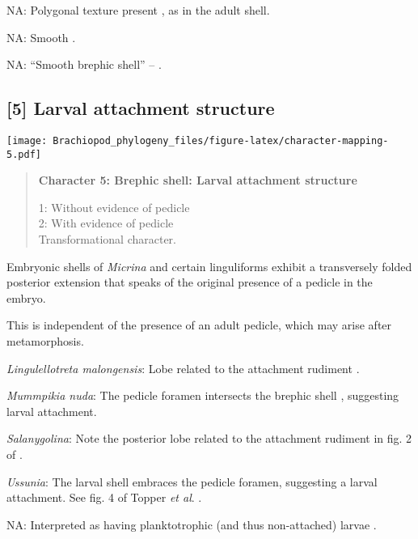 \documentclass[openany]{book}
\theoremstyle{definition}
\theoremstyle{definition}
\theoremstyle{definition}
\theoremstyle{remark}
\begin{document}
\hypertarget{NA-coding-4}{}
NA: Polygonal texture present \citep{Holmer2011Firstrecord}, as in the
adult shell.

\hypertarget{NA-coding-4}{}
NA: Smooth \citep{Holmer2009Theenigmatic}.

\hypertarget{NA-coding-4}{}
NA: ``Smooth brephic shell'' -- \citet{Popov2009Earlyontogeny}.

\subsection*{{[}5{]} Larval attachment
structure}\label{larval-attachment-structure}

\texttt{[image: Brachiopod\_phylogeny\_files/figure-latex/character-mapping-5.pdf]}

\begin{quote}
\textbf{Character 5: Brephic shell: Larval attachment structure}

1: Without evidence of pedicle\\
2: With evidence of pedicle\\
Transformational character.
\end{quote}

Embryonic shells of \emph{Micrina} and certain linguliforms exhibit a
transversely folded posterior extension that speaks of the original
presence of a pedicle in the embryo.

This is independent of the presence of an adult pedicle, which may arise
after metamorphosis.

\hypertarget{Lingulellotreta_malongensis-coding-5}{}
\emph{Lingulellotreta malongensis}: Lobe related to the attachment
rudiment \citep[fig. 2]{Balthasar2009Thebrachiopod}.

\hypertarget{Mummpikia_nuda-coding-5}{}
\emph{Mummpikia nuda}: The pedicle foramen intersects the brephic shell
\citep{Holmer1997EarlyCambrian, Li2004}, suggesting larval attachment.

\hypertarget{Salanygolina-coding-5}{}
\emph{Salanygolina}: Note the posterior lobe related to the attachment
rudiment in fig. 2 of \citet{Balthasar2009Thebrachiopod}.

\hypertarget{Ussunia-coding-5}{}
\emph{Ussunia}: The larval shell embraces the pedicle foramen,
suggesting a larval attachment. See fig. 4 of Topper \emph{et al}.
\citeyearpar{Topper2013Reappraisalof}.

\hypertarget{NA-coding-5}{}
NA: Interpreted as having planktotrophic (and thus non-attached) larvae
\citep{Popov2009Earlyontogeny}.
\end{document}
